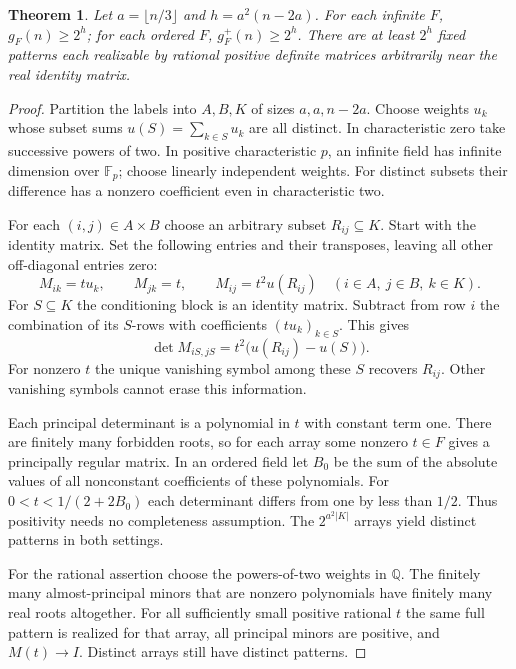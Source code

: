 \documentclass[11pt,a4paper]{amsart}
\newtheorem{theorem}{Theorem}
\begin{document}
\begin{theorem}
Let $a=\lfloor n/3\rfloor$ and $h=a^2(n-2a)$. For each infinite $F$, $g_F(n)\ge 2^h$; for each ordered $F$, $g_F^+(n)\ge 2^h$. There are at least $2^h$ fixed patterns each realizable by rational positive definite matrices arbitrarily near the real identity matrix.
\end{theorem}
\begin{proof}
Partition the labels into $A,B,K$ of sizes $a,a,n-2a$. Choose weights $u_k$ whose subset sums $u(S)=\sum_{k\in S}u_k$ are all distinct. In characteristic zero take successive powers of two. In positive characteristic $p$, an infinite field has infinite dimension over $\mathbb F_p$; choose linearly independent weights. For distinct subsets their difference has a nonzero coefficient even in characteristic two.

For each $(i,j)\in A\times B$ choose an arbitrary subset $R_{ij}\subseteq K$. Start with the identity matrix. Set the following entries and their transposes, leaving all other off-diagonal entries zero:
\[
 M_{ik}=t u_k,\qquad M_{jk}=t,\qquad M_{ij}=t^2u(R_{ij})
 \quad (i\in A,\ j\in B,\ k\in K).
\]
For $S\subseteq K$ the conditioning block is an identity matrix. Subtract from row $i$ the combination of its $S$-rows with coefficients $(tu_k)_{k\in S}$. This gives
\[
 \det M_{iS,jS}=t^2\bigl(u(R_{ij})-u(S)\bigr).
\]
For nonzero $t$ the unique vanishing symbol among these $S$ recovers $R_{ij}$. Other vanishing symbols cannot erase this information.

Each principal determinant is a polynomial in $t$ with constant term one. There are finitely many forbidden roots, so for each array some nonzero $t\in F$ gives a principally regular matrix. In an ordered field let $B_0$ be the sum of the absolute values of all nonconstant coefficients of these polynomials. For $0<t<1/(2+2B_0)$ each determinant differs from one by less than $1/2$. Thus positivity needs no completeness assumption. The $2^{a^2|K|}$ arrays yield distinct patterns in both settings.

For the rational assertion choose the powers-of-two weights in $\mathbb Q$. The finitely many almost-principal minors that are nonzero polynomials have finitely many real roots altogether. For all sufficiently small positive rational $t$ the same full pattern is realized for that array, all principal minors are positive, and $M(t)\to I$. Distinct arrays still have distinct patterns.
\end{proof}
\end{document}
